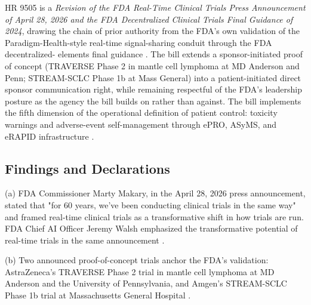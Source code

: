 
\hspace{0.5cm} HR 9505 is a \textit{Revision of the FDA Real-Time Clinical Trials
Press Announcement of April 28, 2026 and the FDA Decentralized
Clinical Trials Final Guidance of 2024}, drawing the chain of prior
authority from the FDA's own validation of the Paradigm-Health-style
real-time signal-sharing conduit through the FDA decentralized-
elements final guidance \cite{fda_rtct_press_2026,
fda_dct_guidance_2024, fda_dhts_drug_development_2026}. The bill
extends a sponsor-initiated proof of concept (TRAVERSE Phase 2 in
mantle cell lymphoma at MD Anderson and Penn; STREAM-SCLC Phase 1b
at Mass General) into a patient-initiated direct sponsor
communication right, while remaining respectful of the FDA's
leadership posture as the agency the bill builds on rather than
against. The bill implements the fifth dimension of the operational
definition of patient control: toxicity warnings and adverse-event
self-management through ePRO, ASyMS, and eRAPID infrastructure
\cite{rocque2025remote_symptom_monitoring, kearney2009asyms,
maguire2017esmart, absolom2021erapid}.

\subsection{Findings and Declarations}

\hspace{0.5cm} (a) FDA Commissioner Marty Makary, in the April 28, 2026 press
announcement, stated that "for 60 years, we've been conducting
clinical trials in the same way" and framed real-time clinical
trials as a transformative shift in how trials are run. FDA Chief
AI Officer Jeremy Walsh emphasized the transformative potential of
real-time trials in the same announcement
\cite{fda_rtct_press_2026}.

(b) Two announced proof-of-concept trials anchor the FDA's
validation: AstraZeneca's TRAVERSE Phase 2 trial in mantle cell
lymphoma at MD Anderson and the University of Pennsylvania, and
Amgen's STREAM-SCLC Phase 1b trial at Massachusetts General
Hospital \cite{fda_rtct_press_2026}.


